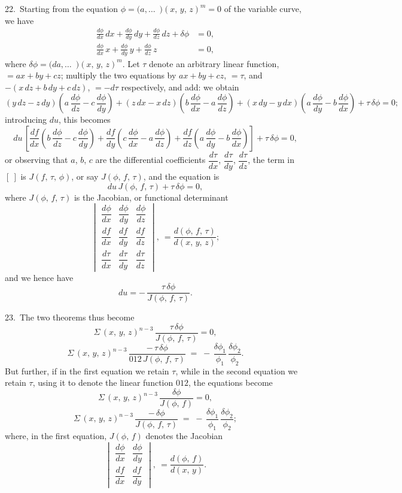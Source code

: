\documentclass[11pt,a4paper]{article}
\theoremstyle{plain}
\theoremstyle{definition}
\theoremstyle{remark}
\begin{document}
22.\ Starting from the equation $\phi = (a,\ldots\!{\,\,\,)}(x,\,y,\,z)^m = 0$ of the variable curve, we have
\begin{align*}
\frac{d\phi}{dx}\,dx + \frac{d\phi}{dy}\,dy + \frac{d\phi}{dz}\,dz + \delta\phi &= 0,\\[0.3em]
\frac{d\phi}{dx}\,x + \frac{d\phi}{dy}\,y + \frac{d\phi}{dz}\,z &= 0,
\end{align*}
where $\delta\phi = (da,\ldots\!{\,\,\,)}(x,\,y,\,z)^m$. Let $\tau$ denote an arbitrary linear function, $= ax + by + cz$; multiply the two equations by $ax + by + cz$, $= \tau$, and $- (x\,dz + b\,dy + c\,dz)$, $= -d\tau$ respectively, and add: we obtain
\[
(y\,dz - z\,dy)\!\left(a\,\frac{d\phi}{dz} - c\,\frac{d\phi}{dy}\right) + (z\,dx - x\,dz)\!\left(b\,\frac{d\phi}{dx} - a\,\frac{d\phi}{dz}\right) + (x\,dy - y\,dx)\!\left(a\,\frac{d\phi}{dy} - b\,\frac{d\phi}{dx}\right) + \tau\,\delta\phi = 0;
\]
introducing $du$, this becomes
\[
du\,\left[\frac{df}{dx}\!\left(b\,\frac{d\phi}{dz} - c\,\frac{d\phi}{dy}\right) + \frac{df}{dy}\!\left(c\,\frac{d\phi}{dx} - a\,\frac{d\phi}{dz}\right) + \frac{df}{dz}\!\left(a\,\frac{d\phi}{dy} - b\,\frac{d\phi}{dx}\right)\right] + \tau\,\delta\phi = 0,
\]
or observing that $a$, $b$, $c$ are the differential coefficients $\dfrac{d\tau}{dx}$, $\dfrac{d\tau}{dy}$, $\dfrac{d\tau}{dz}$, the term in $[\ ]$ is $J(f,\,\tau,\,\phi)$, or say $J(\phi,\,f,\,\tau)$, and the equation is
\[
du\,J(\phi,\,f,\,\tau) + \tau\,\delta\phi = 0,
\]
where $J(\phi,\,f,\,\tau)$ is the Jacobian, or functional determinant
\[
\begin{vmatrix}
\dfrac{d\phi}{dx} & \dfrac{d\phi}{dy} & \dfrac{d\phi}{dz} \\[0.4em]
\dfrac{df}{dx} & \dfrac{df}{dy} & \dfrac{df}{dz} \\[0.4em]
\dfrac{d\tau}{dx} & \dfrac{d\tau}{dy} & \dfrac{d\tau}{dz}
\end{vmatrix},\ = \frac{d(\phi,\,f,\,\tau)}{d(x,\,y,\,z)};
\]
and we hence have
\[
du = -\,\frac{\tau\,\delta\phi}{J(\phi,\,f,\,\tau)}.
\]

23.\ The two theorems thus become
\[
\Sigma\,(x,\,y,\,z)^{n-3}\,\frac{\tau\,\delta\phi}{J(\phi,\,f,\,\tau)} = 0,
\]
\[
\Sigma\,(x,\,y,\,z)^{n-3}\,\frac{-\,\tau\,\delta\phi}{012\,J(\phi,\,f,\,\tau)}
\;=\; -\,\frac{\delta\phi_1}{\phi_1}\,\frac{\delta\phi_2}{\phi_2}.
\]
But further, if in the first equation we retain $\tau$, while in the second equation we retain $\tau$, using it to denote the linear function $012$, the equations become
\[
\Sigma\,(x,\,y,\,z)^{n-3}\,\frac{\delta\phi}{J(\phi,\,f)} = 0,
\]
\[
\Sigma\,(x,\,y,\,z)^{n-3}\,\frac{-\,\delta\phi}{J(\phi,\,f,\,\tau)}
\;=\; -\,\frac{\delta\phi_1}{\phi_1}\,\frac{\delta\phi_2}{\phi_2};
\]
where, in the first equation, $J(\phi,\,f)$ denotes the Jacobian
\[
\begin{vmatrix}
\dfrac{d\phi}{dx} & \dfrac{d\phi}{dy} \\[0.4em]
\dfrac{df}{dx} & \dfrac{df}{dy}
\end{vmatrix},\ = \frac{d(\phi,\,f)}{d(x,\,y)}.
\]
\end{document}
